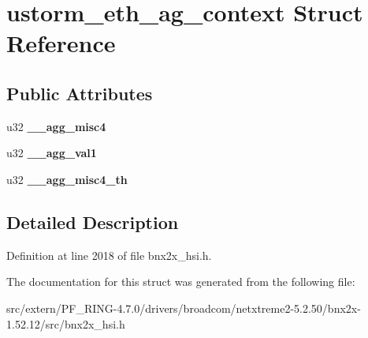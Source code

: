 \hypertarget{structustorm__eth__ag__context}{
\section{ustorm\_\-eth\_\-ag\_\-context Struct Reference}
\label{structustorm__eth__ag__context}
}
\subsection*{Public Attributes}
\begin{DoxyCompactItemize}
\item 
\hypertarget{structustorm__eth__ag__context_a563b6ce66c4450dccd3dba175a81cfe0}{
u32 {\bfseries \_\-\_\-agg\_\-misc4}}
\label{structustorm__eth__ag__context_a563b6ce66c4450dccd3dba175a81cfe0}

\item 
\hypertarget{structustorm__eth__ag__context_a484f196c9f062c042dd1b03618ea31ff}{
u32 {\bfseries \_\-\_\-agg\_\-val1}}
\label{structustorm__eth__ag__context_a484f196c9f062c042dd1b03618ea31ff}

\item 
\hypertarget{structustorm__eth__ag__context_a43dce8a6c89111eff93da3121d5b3f1f}{
u32 {\bfseries \_\-\_\-agg\_\-misc4\_\-th}}
\label{structustorm__eth__ag__context_a43dce8a6c89111eff93da3121d5b3f1f}

\end{DoxyCompactItemize}


\subsection{Detailed Description}


Definition at line 2018 of file bnx2x\_\-hsi.h.



The documentation for this struct was generated from the following file:\begin{DoxyCompactItemize}
\item 
src/extern/PF\_\-RING-\/4.7.0/drivers/broadcom/netxtreme2-\/5.2.50/bnx2x-\/1.52.12/src/bnx2x\_\-hsi.h\end{DoxyCompactItemize}
